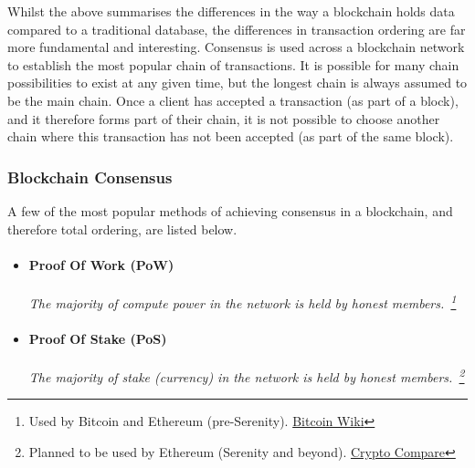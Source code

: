 Whilst the above summarises the differences in the way a blockchain holds data compared to a traditional database, the differences in transaction ordering are far more fundamental and interesting. Consensus is used across a blockchain network to establish the most popular chain of transactions. It is possible for many chain possibilities to exist at any given time, but the longest chain is always assumed to be the main chain. Once a client has accepted a transaction (as part of a block), and it therefore forms part of their chain, it is not possible to choose another chain where this transaction has not been accepted (as part of the same block).

\subsubsection{Blockchain Consensus}

A few of the most popular methods of achieving consensus in a blockchain, and therefore total ordering, are listed below.

\begin{itemize}
  \item
    \paragraph{Proof Of Work (PoW)}
    \textit{The majority of compute power in the network is held by honest members.~\footnote{Used by Bitcoin and Ethereum (pre-Serenity). \href{https://en.bitcoin.it/wiki/Proof_of_work}{Bitcoin Wiki}}}
  \item
    \paragraph{Proof Of Stake (PoS)}
    \textit{The majority of stake (currency) in the network is held by honest members.~\footnote{Planned to be used by Ethereum (Serenity and beyond). \href{https://www.cryptocompare.com/coins/guides/the-ethereum-releases-of-frontier-homestead-metropolis-and-serenity/}{Crypto Compare}}}

\end{itemize}

